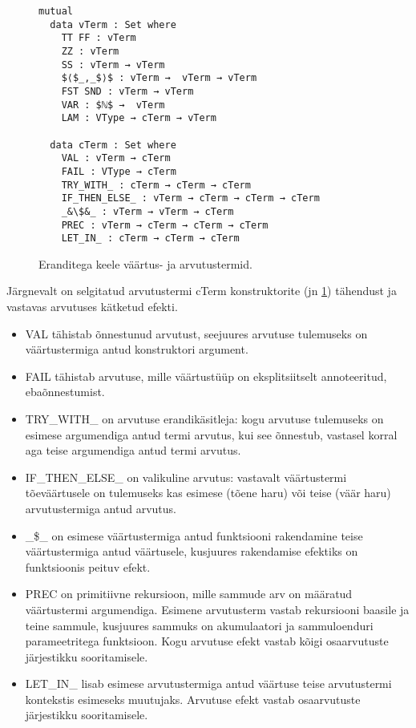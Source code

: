 \documentclass[a4paper,12pt]{article}
\begin{document}
\begin{figure}
  \begin{lstlisting}
mutual
  data vTerm : Set where
    TT FF : vTerm
    ZZ : vTerm
    SS : vTerm → vTerm
    $⟨$_,_$⟩$ : vTerm →  vTerm → vTerm
    FST SND : vTerm → vTerm
    VAR : $ℕ$ →  vTerm
    LAM : VType → cTerm → vTerm

  data cTerm : Set where
    VAL : vTerm → cTerm
    FAIL : VType → cTerm
    TRY_WITH_ : cTerm → cTerm → cTerm
    IF_THEN_ELSE_ : vTerm → cTerm → cTerm → cTerm
    _&\$&_ : vTerm → vTerm → cTerm
    PREC : vTerm → cTerm → cTerm → cTerm
    LET_IN_ : cTerm → cTerm → cTerm

  \end{lstlisting}
  \caption{Eranditega keele väärtus- ja arvutustermid.}
  \label{fig:exc.raw}
\end{figure}

Järgnevalt on selgitatud arvutustermi cTerm konstruktorite (jn \ref{fig:exc.raw}) tähendust ja vastavas arvutuses kätketud efekti.
\begin{itemize}
  \item VAL tähistab õnnestunud arvutust, seejuures arvutuse tulemuseks on väärtustermiga antud konstruktori argument.
  \item FAIL tähistab arvutuse, mille väärtustüüp on eksplitsiitselt annoteeritud, ebaõnnestumist.
  \item TRY_WITH_ on arvutuse erandikäsitleja: kogu arvutuse tulemuseks on esimese argumendiga antud termi arvutus, kui see õnnestub, vastasel korral aga teise argumendiga antud termi arvutus.
  \item IF_THEN_ELSE_ on valikuline arvutus: vastavalt väärtustermi tõeväärtusele on tulemuseks kas esimese (tõene haru) või teise (väär haru) arvutustermiga antud arvutus.
  \item _\$_ on esimese väärtustermiga antud funktsiooni rakendamine teise väärtustermiga antud väärtusele, kusjuures rakendamise efektiks on funktsioonis peituv efekt.
  \item PREC on primitiivne rekursioon, mille sammude arv on määratud väärtustermi argumendiga. Esimene arvutusterm vastab rekursiooni baasile ja teine sammule, kusjuures sammuks on akumulaatori ja sammuloenduri parameetritega funktsioon. Kogu arvutuse efekt vastab kõigi osaarvutuste järjestikku sooritamisele.
  \item LET_IN_ lisab esimese arvutustermiga antud väärtuse teise arvutustermi kontekstis esimeseks muutujaks. Arvutuse efekt vastab osaarvutuste järjestikku sooritamisele.
\end{itemize}
\end{document}
